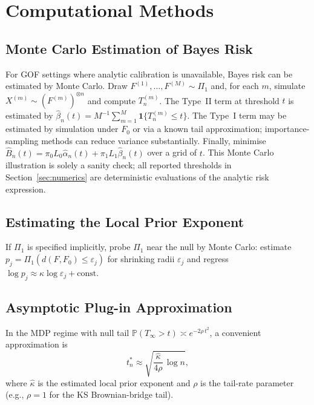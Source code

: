 \documentclass[11pt]{article}
\newcommand{\rhotail}{\rho}  %
\newcommand{\1}{\mathbf{1}}
\newcommand{\PP}{\mathbb{P}}
\theoremstyle{plain}
\theoremstyle{definition}
\theoremstyle{remark}
\begin{document}
\section{Computational Methods}\label{app:computation}

\subsection{Monte Carlo Estimation of Bayes Risk}

For GOF settings where analytic calibration is unavailable, Bayes risk can be estimated by Monte Carlo.
Draw $F^{(1)},\dots,F^{(M)}\sim \Pi_1$ and, for each $m$, simulate $X^{(m)}\sim (F^{(m)})^{\otimes n}$ and compute $T_n^{(m)}$.
The Type~II term at threshold $t$ is estimated by $\widehat{\beta}_n(t)=M^{-1}\sum_{m=1}^M \1\{T_n^{(m)}\le t\}$.
The Type~I term may be estimated by simulation under $F_0$ or via a known tail approximation; importance-sampling methods \citep{Tokdar2010} can reduce variance substantially.
Finally, minimise $\widehat{B}_n(t)=\pi_0L_0\widehat{\alpha}_n(t)+\pi_1L_1\widehat{\beta}_n(t)$ over a grid of $t$.
This Monte Carlo illustration is solely a sanity check; all reported thresholds in Section~\ref{sec:numerics} are deterministic evaluations of the analytic risk expression.

\subsection{Estimating the Local Prior Exponent}

If $\Pi_1$ is specified implicitly, probe $\Pi_1$ near the null by Monte Carlo:
estimate $p_j=\Pi_1(d(F,F_0)\le \varepsilon_j)$ for shrinking radii $\varepsilon_j$ and regress
$\log p_j \approx \kappa\log\varepsilon_j + \text{const}$.

\subsection{Asymptotic Plug-in Approximation}

In the MDP regime with null tail $\PP(T_\infty>t)\asymp e^{-2\rhotail\, t^2}$, a convenient approximation is
\begin{equation}\label{eq:asymp-plugin}
t_n^* \approx \sqrt{\frac{\hat{\kappa}}{4\rhotail}\,\log n},
\end{equation}
where $\hat{\kappa}$ is the estimated local prior exponent and $\rhotail$ is the tail-rate parameter (e.g., $\rhotail=1$ for the KS Brownian-bridge tail).
\end{document}

